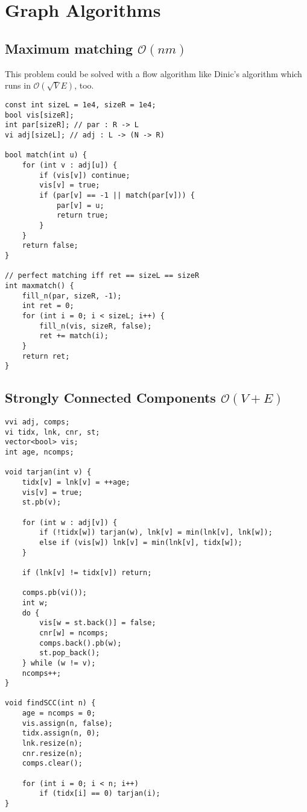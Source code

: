 \documentclass{article}
\begin{document}
\section{Graph Algorithms}
\subsection{Maximum matching $\mathcal{O}(n m)$}

This problem could be solved with a flow algorithm like Dinic's algorithm which runs in $\mathcal{O} (\sqrt{V} E)$, too.

\begin{lstlisting}
const int sizeL = 1e4, sizeR = 1e4;
bool vis[sizeR];
int par[sizeR]; // par : R -> L
vi adj[sizeL]; // adj : L -> (N -> R)

bool match(int u) {
	for (int v : adj[u]) {
		if (vis[v]) continue;
		vis[v] = true;
		if (par[v] == -1 || match(par[v])) {
			par[v] = u;
			return true;
		}
	}
	return false;
}

// perfect matching iff ret == sizeL == sizeR
int maxmatch() {
	fill_n(par, sizeR, -1);
	int ret = 0;
	for (int i = 0; i < sizeL; i++) {
		fill_n(vis, sizeR, false);
		ret += match(i);
	}
	return ret;
}
\end{lstlisting}

\subsection{Strongly Connected Components $\mathcal{O}(V + E)$}

\begin{lstlisting}
vvi adj, comps;
vi tidx, lnk, cnr, st;
vector<bool> vis;
int age, ncomps;

void tarjan(int v) {
	tidx[v] = lnk[v] = ++age;
	vis[v] = true;
	st.pb(v);

	for (int w : adj[v]) {
		if (!tidx[w]) tarjan(w), lnk[v] = min(lnk[v], lnk[w]);
		else if (vis[w]) lnk[v] = min(lnk[v], tidx[w]);
	}

	if (lnk[v] != tidx[v]) return;

	comps.pb(vi());
	int w;
	do {
		vis[w = st.back()] = false;
		cnr[w] = ncomps;
		comps.back().pb(w);
		st.pop_back();
	} while (w != v);
	ncomps++;
}

void findSCC(int n) {
	age = ncomps = 0;
	vis.assign(n, false);
	tidx.assign(n, 0);
	lnk.resize(n);
	cnr.resize(n);
	comps.clear();

	for (int i = 0; i < n; i++)
		if (tidx[i] == 0) tarjan(i);
}
\end{lstlisting}
\end{document}

